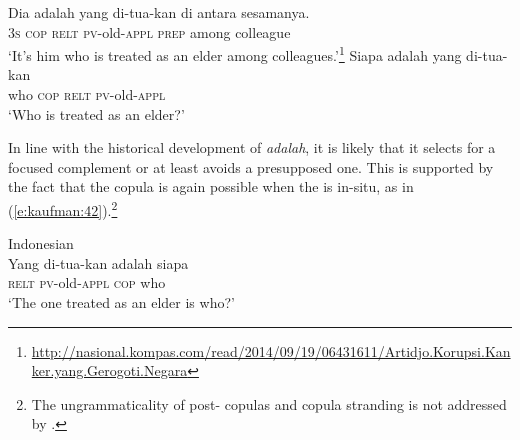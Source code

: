 \documentclass[output=paper]{langsci/langscibook}
\begin{document}
\begin{exe}
	\ex\label{e:kaufman:41}
	\begin{xlist}
		\ex\label{e:kaufman:41a}
        \gll Dia adalah yang di-tua-kan di antara sesamanya.\\
		\textsc{3s} \textsc{cop} \textsc{relt} \textsc{pv-}old-\textsc{appl} \textsc{prep} among colleague\\
		\glt `It's him who is treated as an elder among colleagues.'\footnote{\url{http://nasional.kompas.com/read/2014/09/19/06431611/Artidjo.Korupsi.Kanker.yang.Gerogoti.Negara}}
		\ex\label{e:kaufman:41b}
        \gll Siapa {\USOParen}{\USStar}adalah{\USCParen} yang di-tua-kan{\USQMark}\\ %
		who \phantom{(*}\textsc{cop} \textsc{relt} \textsc{pv-}old-\textsc{appl}\\
		\glt `Who is treated as an elder?'
	\end{xlist}
\end{exe}

\noindent
In line with the historical development of \textit{adalah}, it is likely that it selects for a focused complement or at least avoids a presupposed one. This is supported by the fact that the copula is again possible when the  is in-situ, as in (\ref{e:kaufman:42}).\footnote{The ungrammaticality of post- copulas and copula stranding is not ​addressed ​by \citet{Cole:2000}.}

\begin{exe}
	\ex\label{e:kaufman:42}{Indonesian}\\
	\gll Yang di-tua-kan {\USOParen}adalah{\USCParen} siapa{\USQMark}\\
	\textsc{relt} \textsc{pv-}old-\textsc{appl} \phantom{(}\textsc{cop} who\\
	\glt `The one treated as an elder is who?'
\end{exe}
\end{document}
